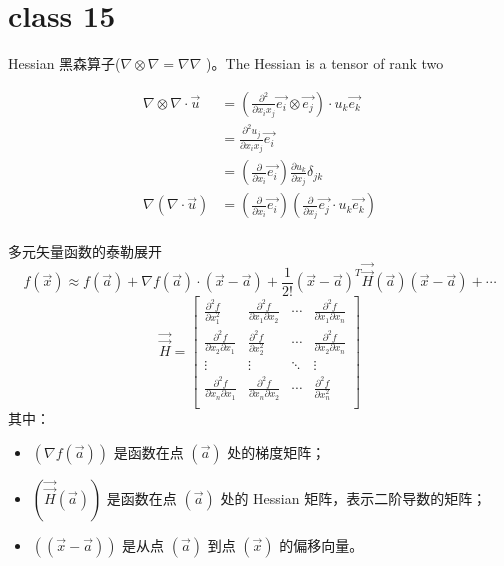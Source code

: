 \documentclass[12pt, a4paper, oneside, UTF8]{ctexbook}  %
\begin{document}
    \section{class 15}
    \begin{defn}
        Hessian 黑森算子($\nabla\otimes\nabla=\nabla\nabla$ )。The Hessian is a tensor of rank two
        \begin{tui}
        \begin{align*}
            \nabla\otimes\nabla\cdot\vec{u}&=\left(\frac{\partial^2}{\partial x_ix_j}\vec{e_i}\otimes\vec{e_j}\right)
            \cdot u_k\vec{e_k}\\
            &=\frac{\partial^2 u_j}{\partial x_ix_j}\vec{e_i}\\
            &=\left(\frac{\partial }{\partial x_i}\vec{e_i}\right)\frac{\partial u_k}{\partial x_j}\delta_{jk}\\
            \nabla\left(\nabla\cdot\vec{u}\right)
            &=\left(\frac{\partial }{\partial x_i}\vec{e_i}\right)\left(\frac{\partial }{\partial x_j}\vec{e_j}\cdot u_k\vec{e_k}\right)\\
        \end{align*}
        \end{tui}
    \end{defn}
    \begin{example}
        多元矢量函数的泰勒展开
        \[
    f(\vec{x}) \approx f(\vec{a}) + \nabla f(\vec{a}) \cdot (\vec{x} - \vec{a}) + \frac{1}{2!} (\vec{x} - \vec{a})^T \vec{\vec{H}}(\vec{a})(\vec{x} - \vec{a}) + \cdots
        \]
        \[
            \vec{\vec{H}} = \begin{bmatrix}
            \frac{\partial^2 f}{\partial x_1^2} & \frac{\partial^2 f}{\partial x_1 \partial x_2} & \cdots & \frac{\partial^2 f}{\partial x_1 \partial x_n} \\
            \frac{\partial^2 f}{\partial x_2 \partial x_1} & \frac{\partial^2 f}{\partial x_2^2} & \cdots & \frac{\partial^2 f}{\partial x_2 \partial x_n} \\
            \vdots & \vdots & \ddots & \vdots \\
            \frac{\partial^2 f}{\partial x_n \partial x_1} & \frac{\partial^2 f}{\partial x_n \partial x_2} & \cdots & \frac{\partial^2 f}{\partial x_n^2} \\
            \end{bmatrix}
            \]
            其中：
            \begin{itemize}
                \item $(\nabla f(\vec{a}))$ 是函数在点 $(\vec{a})$ 处的梯度矩阵；
                \item $(\vec{\vec{H}}(\vec{a}))$ 是函数在点 $(\vec{a})$ 处的 Hessian 矩阵，表示二阶导数的矩阵；
                \item $((\vec{x} - \vec{a}))$ 是从点 $(\vec{a})$ 到点 $(\vec{x})$ 的偏移向量。
            \end{itemize}
    \end{example}
\end{document}
